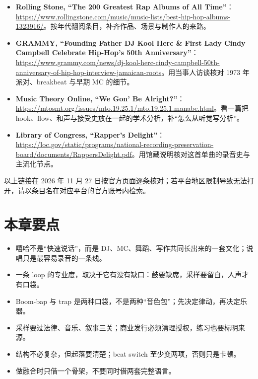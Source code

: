 \begin{sloppypar}
\begin{itemize}
\item \textbf{Rolling Stone, ``The 200 Greatest Rap Albums of All Time''}：\url{https://www.rollingstone.com/music/music-lists/best-hip-hop-albums-1323916/}。按年代翻阅条目，补齐作品、场景与制作人的来路。
\item \textbf{GRAMMY, ``Founding Father DJ Kool Herc \& First Lady Cindy Campbell Celebrate Hip-Hop's 50th Anniversary''}：\url{https://www.grammy.com/news/dj-kool-herc-cindy-campbell-50th-anniversary-of-hip-hop-interview-jamaican-roots}。用当事人访谈核对 1973 年派对、breakbeat 与早期 MC 的细节。
\item \textbf{Music Theory Online, ``We Gon' Be Alright?''}：\url{https://mtosmt.org/issues/mto.19.25.1/mto.19.25.1.manabe.html}。看一篇把 hook、flow、和声与接受史放在一起的学术分析，补“怎么从听觉写分析”。
\item \textbf{Library of Congress, ``Rapper's Delight''}：\url{https://loc.gov/static/programs/national-recording-preservation-board/documents/RappersDelight.pdf}。用馆藏说明核对这首单曲的录音史与主流化节点。
\end{itemize}
\end{sloppypar}

以上链接在 2026 年 11 月 27 日按官方页面逐条核对；若平台地区限制导致无法打开，请以条目名在对应平台的官方账号内检索。

\section{本章要点}
\label{sec:hiphop-takeaways}

\begin{itemize}
\item 嘻哈不是“快速说话”，而是 DJ、MC、舞蹈、写作共同长出来的一套文化；说唱只是最容易录音的一条线。
\item 一条 loop 的专业度，取决于它有没有缺口：鼓要缺席，采样要留白，人声才有口袋。
\item Boom-bap 与 trap 是两种口袋，不是两种“音色包”；先决定律动，再决定乐器。
\item 采样要过法律、音乐、叙事三关；商业发行必须清理授权，练习也要标明来源。
\item 结构不必复杂，但起落要清楚；beat switch 至少变两项，否则只是卡顿。
\item 做融合时只借一个骨架，不要同时借两套完整语言。
\end{itemize}


